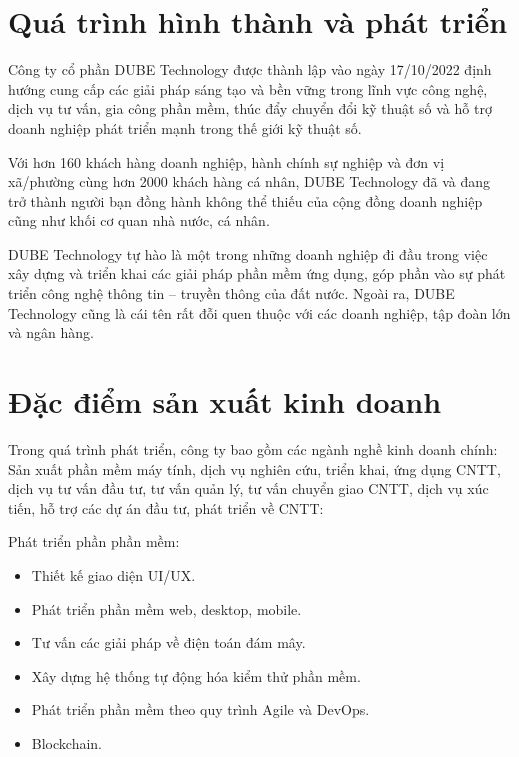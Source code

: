 \documentclass[12pt,a4paper]{report}
\begin{document}
	\section{Quá trình hình thành và phát triển}
		\hspace{1.0cm} {Công ty cổ phần DUBE Technology được thành lập vào ngày 17/10/2022 định hướng cung cấp các giải pháp sáng tạo và bền vững trong lĩnh vực công nghệ, dịch vụ tư vấn, gia công phần mềm, thúc đẩy chuyển đổi kỹ thuật số và hỗ trợ doanh nghiệp phát triển mạnh trong thế giới kỹ thuật số. }
		
		\hspace{0.3cm} {Với hơn 160 khách hàng doanh nghiệp, hành chính sự nghiệp và đơn vị xã/phường cùng hơn 2000 khách hàng cá nhân, DUBE Technology đã và đang trở thành người bạn đồng hành không thể thiếu của cộng đồng doanh nghiệp cũng như khối cơ quan nhà nước, cá nhân. }
		
		\hspace{0.3cm} {DUBE Technology tự hào là một trong những doanh nghiệp đi đầu trong việc xây dựng và triển khai các giải pháp phần mềm ứng dụng, góp phần vào sự phát triển công nghệ thông tin – truyền thông của đất nước. Ngoài ra, DUBE Technology cũng là cái tên rất đỗi quen thuộc với các doanh nghiệp, tập đoàn lớn và ngân hàng.}
	\section{Đặc điểm sản xuất kinh doanh}
		\hspace{1.0cm} {Trong quá trình phát triển, công ty bao gồm các ngành nghề kinh doanh chính: Sản xuất phần mềm máy tính, dịch vụ nghiên cứu, triển khai, ứng dụng CNTT, dịch vụ tư vấn đầu tư, tư vấn quản lý, tư vấn chuyển giao CNTT, dịch vụ xúc tiến, hỗ trợ các dự án đầu tư, phát triển về CNTT:}

		\hspace{0.3cm} {Phát triển phần phần mềm:}
			\begin{itemize}
				\item Thiết kế giao diện UI/UX.
				\item Phát triển phần mềm web, desktop, mobile.
				\item Tư vấn các giải pháp về điện toán đám mây.
				\item Xây dựng hệ thống tự động hóa kiểm thử phần mềm.
				\item Phát triển phần mềm theo quy trình Agile và DevOps.
				\item Blockchain.
			\end{itemize}
		
\end{document}
